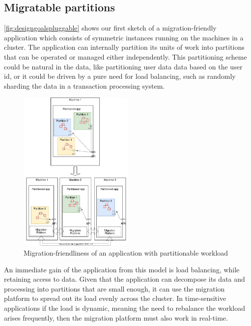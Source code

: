\subsection{Migratable partitions}

\autoref{fig:designgoalspluggable} shows our first sketch of a
migration-friendly application which consists of symmetric instances
running on the machines in a cluster. The application can internally
partition its units of work into partitions that can be operated or
managed either independently.
This partitioning scheme could be natural in the data, like
partitioning user data data based on the user id, or it could be driven
by a pure need for load balancing, such as randomly sharding the data
in a transaction processing system.


\begin{figure}[t]
\centering

\includegraphics[width=0.5\textwidth]{design-goals-pluggable.drawio}
\caption{
    Migration-friendliness of an application with partitionable workload
}
\label{fig:designgoalspluggable}
\end{figure}

An immediate gain of the application from this model is load balancing,
while retaining access to data.
Given that the application can decompose its data and processing into
partitions that are small enough, it can use the migration platform to
spread
out its load evenly across the cluster. In time-sensitive applications
if the load is dynamic,
meaning the need to rebalance the workload arises frequently,
then the migration platform must also work in real-time.

